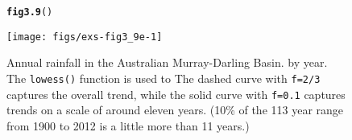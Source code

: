 \documentclass[12pt, a4paper,  BCOR=8.25mm, DIV=15]{scrartcl}\usepackage[]{graphicx}\usepackage[]{color}
\makeatletter
\newcommand{\hlstd}[1]{\textcolor[rgb]{0.345,0.345,0.345}{#1}}%
\newcommand{\hlkwd}[1]{\textcolor[rgb]{0.737,0.353,0.396}{\textbf{#1}}}%
\newenvironment{kframe}{%
 \def\at@end@of@kframe{}%
 \ifinner\ifhmode%
  \def\at@end@of@kframe{\end{minipage}}%
  \begin{minipage}{\columnwidth}%
 \fi\fi%
 \def\FrameCommand##1{\hskip\@totalleftmargin \hskip-\fboxsep
 \colorbox{shadecolor}{##1}\hskip-\fboxsep
     \hskip-\linewidth \hskip-\@totalleftmargin \hskip\columnwidth}%
 \MakeFramed {\advance\hsize-\width
   \@totalleftmargin\z@ \linewidth\hsize
   \@setminipage}}%
 {\par\unskip\endMakeFramed%
 \at@end@of@kframe}
\newenvironment{knitrout}{}{} %
\newcommand{\txtt}[1]{{\texttt{#1}}}
\makeatother
\begin{document}
\begin{figure}
\begin{knitrout}
\color{fgcolor}\begin{kframe}
\begin{alltt}
\hlkwd{fig3.9}\hlstd{()}
\end{alltt}
\end{kframe}

{\centering \texttt{[image: figs/exs-fig3\_9e-1]} 

}



\end{knitrout}
\caption{Annual rainfall in the Australian Murray-Darling Basin.
by year.  The \txtt{lowess()} function is used to
The dashed curve with \txtt{f=2/3} captures the
overall trend, while the solid curve with \txtt{f=0.1}
captures trends on a scale of around eleven years. (10\% of the 113 year
range from 1900 to 2012 is a little more than 11 years.)\label{fig:mdbRain}}
\end{figure}
\end{document}
